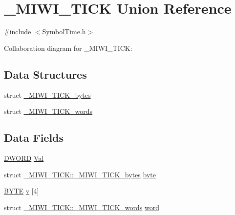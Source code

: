 \hypertarget{union___m_i_w_i___t_i_c_k}{}\section{\+\_\+\+M\+I\+W\+I\+\_\+\+T\+I\+C\+K Union Reference}
\label{union___m_i_w_i___t_i_c_k}


{\ttfamily \#include $<$Symbol\+Time.\+h$>$}



Collaboration diagram for \+\_\+\+M\+I\+W\+I\+\_\+\+T\+I\+C\+K\+:
\subsection*{Data Structures}
\begin{DoxyCompactItemize}
\item 
struct \hyperlink{struct___m_i_w_i___t_i_c_k_1_1___m_i_w_i___t_i_c_k__bytes}{\+\_\+\+M\+I\+W\+I\+\_\+\+T\+I\+C\+K\+\_\+bytes}
\item 
struct \hyperlink{struct___m_i_w_i___t_i_c_k_1_1___m_i_w_i___t_i_c_k__words}{\+\_\+\+M\+I\+W\+I\+\_\+\+T\+I\+C\+K\+\_\+words}
\end{DoxyCompactItemize}
\subsection*{Data Fields}
\begin{DoxyCompactItemize}
\item 
\hyperlink{_generic_type_defs_8h_ad342ac907eb044443153a22f964bf0af}{D\+W\+O\+R\+D} \hyperlink{union___m_i_w_i___t_i_c_k_a1a2aefd22f32fe19c7a40fd62958b591}{Val}
\item 
struct \hyperlink{struct___m_i_w_i___t_i_c_k_1_1___m_i_w_i___t_i_c_k__bytes}{\+\_\+\+M\+I\+W\+I\+\_\+\+T\+I\+C\+K\+::\+\_\+\+M\+I\+W\+I\+\_\+\+T\+I\+C\+K\+\_\+bytes} \hyperlink{union___m_i_w_i___t_i_c_k_a9ddf7108ad882173758c40079962abfc}{byte}
\item 
\hyperlink{_generic_type_defs_8h_a4ae1dab0fb4b072a66584546209e7d58}{B\+Y\+T\+E} \hyperlink{union___m_i_w_i___t_i_c_k_a6a8b1b6abca9b51faec40b33d22aed79}{v} \mbox{[}4\mbox{]}
\item 
struct \hyperlink{struct___m_i_w_i___t_i_c_k_1_1___m_i_w_i___t_i_c_k__words}{\+\_\+\+M\+I\+W\+I\+\_\+\+T\+I\+C\+K\+::\+\_\+\+M\+I\+W\+I\+\_\+\+T\+I\+C\+K\+\_\+words} \hyperlink{union___m_i_w_i___t_i_c_k_a9b9aceff5a9b43f59427a3ee0f715ef7}{word}
\end{DoxyCompactItemize}


